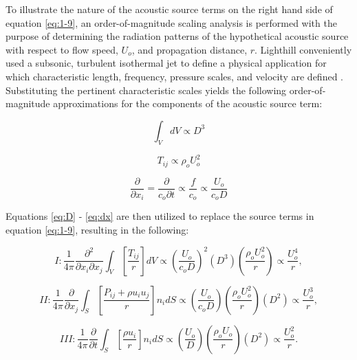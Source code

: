 To illustrate the nature of the acoustic source terms on the right hand side of equation \ref{eq:1-9}, an order-of-magnitude scaling analysis is performed with the purpose of determining the radiation patterns of the hypothetical acoustic source with respect to flow speed, $U_o$, and propagation distance, $r$. Lighthill conveniently used a subsonic, turbulent isothermal jet to define a physical application for which characteristic length, frequency, pressure scales, and velocity are defined \cite{lighthill1954}. Substituting the pertinent characteristic scales yields the following order-of-magnitude approximations for the components of the acoustic source term:

\begin{equation} \label{eq:D}
\int_{V} dV \propto D^3
\end{equation}

\begin{equation} \label{eq:U}
T_{ij} \propto \rho_o U_o^2
\end{equation}

\begin{equation} \label{eq:dx}
\frac{\partial}{\partial x_i} = \frac{\partial}{c_o \partial t} \propto \frac{f}{c_o} \propto \frac{U_o}{c_o D}
\end{equation}

Equations \ref{eq:D} - \ref{eq:dx} are then utilized to replace the source terms in equation \ref{eq:1-9}, resulting in the following:

\begin{equation}
I : \frac{1}{4\pi} \frac{\partial^2}{\partial x_i \partial x_j} \int_V \left[ \frac{T_{ij}}{r} \right] dV \propto \left( \frac{U_o}{c_o D} \right)^2 \left( D^3 \right) \left( \frac{\rho_o U_o^2}{r} \right) \propto \frac{U_o^4}{r},
\end{equation}

\begin{equation}
II : \frac{1}{4\pi} \frac{\partial}{\partial x_j} \int_S \left[ \frac{P_{ij} + \rho u_i u_j}{r} \right] n_i dS \propto \left( \frac{U_o}{c_oD} \right) \left( \frac{\rho_o U_o^2}{r} \right) \left( D^2 \right) \propto \frac{U_o^3}{r},
\end{equation}

\begin{equation}
III : \frac{1}{4\pi} \frac{\partial}{\partial t} \int_S \left[ \frac{\rho u_i}{r} \right] n_i dS \propto \left( \frac{U_o}{D} \right) \left( \frac{\rho_o U_o}{r} \right) \left( D^2 \right) \propto \frac{U_o^2}{r}.
\end{equation}

